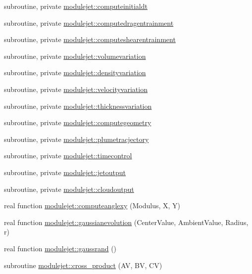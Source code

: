 \begin{DoxyCompactItemize}
subroutine, private \mbox{\hyperlink{namespacemodulejet_a0425b9fdbf288a0e893428f44a92b9ea}{modulejet\+::computeinitialdt}}
\item 
subroutine, private \mbox{\hyperlink{namespacemodulejet_a8bbbce93ba8d9ba74525873c550cdf8b}{modulejet\+::computedragentrainment}}
\item 
subroutine, private \mbox{\hyperlink{namespacemodulejet_a21b954c77f4addf0f268edc0e9448a18}{modulejet\+::computeshearentrainment}}
\item 
subroutine, private \mbox{\hyperlink{namespacemodulejet_abe8dc92537467b9dcd97c4a01b77f51c}{modulejet\+::volumevariation}}
\item 
subroutine, private \mbox{\hyperlink{namespacemodulejet_a05449786a790959e45db1fc1bd9f93f6}{modulejet\+::densityvariation}}
\item 
subroutine, private \mbox{\hyperlink{namespacemodulejet_a4aaeebe926aea33dd1391746d2cdaa32}{modulejet\+::velocityvariation}}
\item 
subroutine, private \mbox{\hyperlink{namespacemodulejet_a5241bdca6d72d79d96fdc8d9b63a291a}{modulejet\+::thicknessvariation}}
\item 
subroutine, private \mbox{\hyperlink{namespacemodulejet_a0d3bcdd114f549e27a46b673224a1f35}{modulejet\+::computegeometry}}
\item 
subroutine, private \mbox{\hyperlink{namespacemodulejet_a9175197cbe465e40fa03bc6a7c788871}{modulejet\+::plumetracjectory}}
\item 
subroutine, private \mbox{\hyperlink{namespacemodulejet_a7518a8afbcafcfeedfc10f5a3a205b33}{modulejet\+::timecontrol}}
\item 
subroutine, private \mbox{\hyperlink{namespacemodulejet_a200bdafc097359afe09ed14b7a55d8b7}{modulejet\+::jetoutput}}
\item 
subroutine, private \mbox{\hyperlink{namespacemodulejet_a61dad6f878bf6cce690b9523901012ac}{modulejet\+::cloudoutput}}
\item 
real function \mbox{\hyperlink{namespacemodulejet_adbbd50d3810071999488736815c23285}{modulejet\+::computeanglexy}} (Modulus, X, Y)
\item 
real function \mbox{\hyperlink{namespacemodulejet_a54205285b4f5a4d3d7204aa240f92d64}{modulejet\+::gaussianevolution}} (Center\+Value, Ambient\+Value, Radius, r)
\item 
real function \mbox{\hyperlink{namespacemodulejet_a5b1cd3a55b2e6494e998c7233db5ec58}{modulejet\+::gaussrand}} ()
\item 
subroutine \mbox{\hyperlink{namespacemodulejet_a2cbc865fd41278d7ee8a6b0036bc3114}{modulejet\+::cross\+\_\+product}} (AV, BV, CV)

\end{DoxyCompactItemize}
